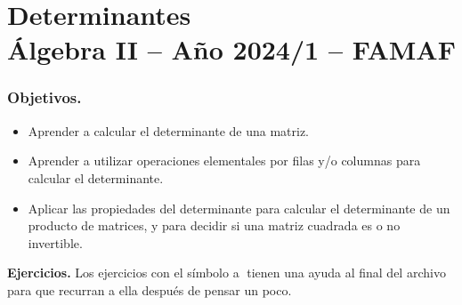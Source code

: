 \chapter{Determinantes\\Álgebra  II -- Año 2024/1 -- FAMAF}\label{practico-4}
    


\subsection*{Objetivos.}

\begin{itemize}
\item Aprender a calcular el determinante de una matriz.

\item Aprender a utilizar operaciones elementales por filas y/o columnas para calcular el determinante.

\item Aplicar las propiedades del determinante para calcular el determinante de un producto de matrices, y para decidir si una matriz cuadrada es o no invertible.
\end{itemize}
        

\noindent \textbf{Ejercicios.} Los ejercicios con el símbolo \textcircled{a} tienen una ayuda al final del archivo para que recurran a ella después de pensar un poco.

